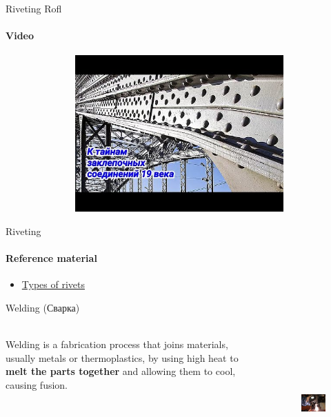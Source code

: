 \documentclass[aspectratio=169]{beamer}
\begin{document}
\begin{frame}[t]{Riveting Rofl}
    \framesubtitle{Video}
    \vspace{-0.6cm}
    \begin{figure}[H]
        \href{https://youtu.be/mGOiPPM6pKM}{
            \centering\includegraphics[height=6cm,width=1\textwidth,keepaspectratio]{riveting_rofl_video.jpg}}
        \label{fig:riveting_rofl_video.jpg}
    \end{figure}
\end{frame}

\begin{frame}[t]{Riveting}
    \framesubtitle{Reference material}
    \begin{itemize}
        \item \href{https://www.theengineerspost.com/types-of-rivets/}{Types of rivets}
    \end{itemize}
\end{frame}



\begin{frame}[t]{Welding (Сварка)}
    \framesubtitle{}
    \begin{columns}[T,onlytextwidth]
        \begin{column}{0.49\textwidth}
            Welding is a fabrication process that joins materials, usually metals or thermoplastics, by using high heat to \textbf{melt the parts together} and allowing them to cool, causing fusion.
        \end{column}
        \begin{column}{0.49\textwidth}
            \begin{figure}[H]
                \centering\includegraphics[height=5cm,width=1\textwidth,keepaspectratio]{welding.jpg}
                \label{fig:welding.jpg}
            \end{figure}
        \end{column}
    \end{columns}
\end{frame}
\end{document}
